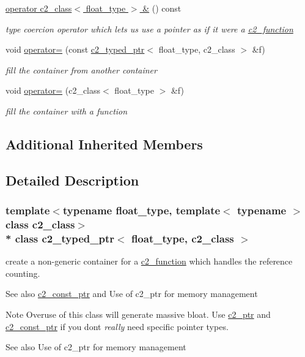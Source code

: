 \begin{DoxyCompactItemize}
\hyperlink{classc2__typed__ptr_aaef9ba4ce05fd58753d6708a1137fce8}{operator c2\+\_\+class$<$ float\+\_\+type $>$ \&} () const 
\begin{DoxyCompactList}\small\item\em type coercion operator which lets us use a pointer as if it were a \hyperlink{classc2__function}{c2\+\_\+function} \end{DoxyCompactList}\item 
void \hyperlink{classc2__typed__ptr_aaf609e847cb4478d3d545d17c9baf412}{operator=} (const \hyperlink{classc2__typed__ptr}{c2\+\_\+typed\+\_\+ptr}$<$ float\+\_\+type, c2\+\_\+class $>$ \&f)
\begin{DoxyCompactList}\small\item\em fill the container from another container \end{DoxyCompactList}\item 
void \hyperlink{classc2__typed__ptr_a4a2c9f95298686d210a5ce77a76a028e}{operator=} (c2\+\_\+class$<$ float\+\_\+type $>$ \&f)
\begin{DoxyCompactList}\small\item\em fill the container with a function \end{DoxyCompactList}\end{DoxyCompactItemize}
\subsection*{Additional Inherited Members}


\subsection{Detailed Description}
\subsubsection*{template$<$typename float\+\_\+type, template$<$ typename $>$ class c2\+\_\+class$>$\\*
class c2\+\_\+typed\+\_\+ptr$<$ float\+\_\+type, c2\+\_\+class $>$}

create a non-\/generic container for a \hyperlink{classc2__function}{c2\+\_\+function} which handles the reference counting. 

\begin{DoxySeeAlso}{See also}
\hyperlink{classc2__const__ptr}{c2\+\_\+const\+\_\+ptr} and Use of c2\+\_\+ptr for memory management
\end{DoxySeeAlso}
\begin{DoxyNote}{Note}
Overuse of this class will generate massive bloat. Use \hyperlink{classc2__ptr}{c2\+\_\+ptr} and \hyperlink{classc2__const__ptr}{c2\+\_\+const\+\_\+ptr} if you don\textquotesingle{}t {\itshape really} need specific pointer types. 
\end{DoxyNote}
\begin{DoxySeeAlso}{See also}
Use of c2\+\_\+ptr for memory management 
\end{DoxySeeAlso}


